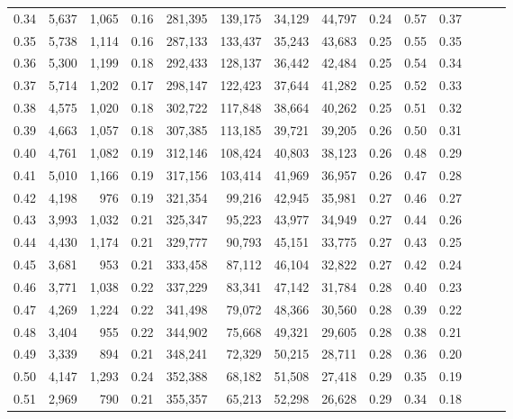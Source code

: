 \begin{tabular}{rrrrrrrrrrrrrr}
0.34 &   5,637 &  1,065 &  0.16 &  281,395 &  139,175 &  34,129 &  44,797 &  0.24 &  0.57 &      0.37 \\
0.35 &   5,738 &  1,114 &  0.16 &  287,133 &  133,437 &  35,243 &  43,683 &  0.25 &  0.55 &      0.35 \\
0.36 &   5,300 &  1,199 &  0.18 &  292,433 &  128,137 &  36,442 &  42,484 &  0.25 &  0.54 &      0.34 \\
0.37 &   5,714 &  1,202 &  0.17 &  298,147 &  122,423 &  37,644 &  41,282 &  0.25 &  0.52 &      0.33 \\
0.38 &   4,575 &  1,020 &  0.18 &  302,722 &  117,848 &  38,664 &  40,262 &  0.25 &  0.51 &      0.32 \\
0.39 &   4,663 &  1,057 &  0.18 &  307,385 &  113,185 &  39,721 &  39,205 &  0.26 &  0.50 &      0.31 \\
0.40 &   4,761 &  1,082 &  0.19 &  312,146 &  108,424 &  40,803 &  38,123 &  0.26 &  0.48 &      0.29 \\
0.41 &   5,010 &  1,166 &  0.19 &  317,156 &  103,414 &  41,969 &  36,957 &  0.26 &  0.47 &      0.28 \\
0.42 &   4,198 &    976 &  0.19 &  321,354 &   99,216 &  42,945 &  35,981 &  0.27 &  0.46 &      0.27 \\
0.43 &   3,993 &  1,032 &  0.21 &  325,347 &   95,223 &  43,977 &  34,949 &  0.27 &  0.44 &      0.26 \\
0.44 &   4,430 &  1,174 &  0.21 &  329,777 &   90,793 &  45,151 &  33,775 &  0.27 &  0.43 &      0.25 \\
0.45 &   3,681 &    953 &  0.21 &  333,458 &   87,112 &  46,104 &  32,822 &  0.27 &  0.42 &      0.24 \\
0.46 &   3,771 &  1,038 &  0.22 &  337,229 &   83,341 &  47,142 &  31,784 &  0.28 &  0.40 &      0.23 \\
0.47 &   4,269 &  1,224 &  0.22 &  341,498 &   79,072 &  48,366 &  30,560 &  0.28 &  0.39 &      0.22 \\
0.48 &   3,404 &    955 &  0.22 &  344,902 &   75,668 &  49,321 &  29,605 &  0.28 &  0.38 &      0.21 \\
0.49 &   3,339 &    894 &  0.21 &  348,241 &   72,329 &  50,215 &  28,711 &  0.28 &  0.36 &      0.20 \\
0.50 &   4,147 &  1,293 &  0.24 &  352,388 &   68,182 &  51,508 &  27,418 &  0.29 &  0.35 &      0.19 \\
0.51 &   2,969 &    790 &  0.21 &  355,357 &   65,213 &  52,298 &  26,628 &  0.29 &  0.34 &      0.18 \\

\end{tabular}
